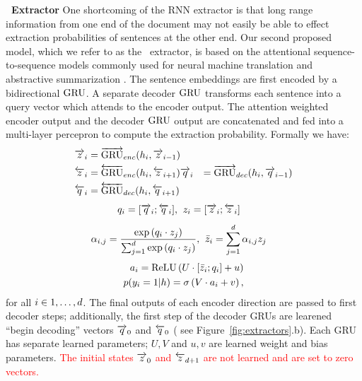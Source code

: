 \textbf{\sts~Extractor} One shortcoming of the RNN extractor is that long range
information from one end of the document may not easily be able to effect 
extraction probabilities of sentences at the other end. 
Our second proposed model, which we refer to as the \stsbf~extractor,
is based on the attentional sequence-to-sequence models commonly
used for neural machine translation \cite{badhanau} and 
abstractive summarization \cite{see}. The sentence embeddings are first
encoded by a bidirectional $\operatorname{GRU}$. A separate decoder $\operatorname{GRU}$ transforms each 
sentence into a query vector which attends to the encoder output. The
attention weighted encoder output and the decoder $\operatorname{GRU}$ output are concatenated
and fed into a multi-layer percepron to compute the extraction probability.
Formally we have:
\begin{align}
  \overrightarrow{z}_i &= \overrightarrow{\operatorname{GRU}}_{enc}(h_i, \overrightarrow{z}_{i-1}) \\
  \overleftarrow{z}_i &= \overleftarrow{\operatorname{GRU}}_{enc}(h_i, \overleftarrow{z}_{i+1}) 
  \overrightarrow{q}_i &= \overrightarrow{\operatorname{GRU}}_{dec}(h_i, \overrightarrow{q}_{i-1}) \\
  \overleftarrow{q}_i &= \overleftarrow{\operatorname{GRU}}_{dec}(h_i, \overleftarrow{q}_{i+1}) 
\end{align}
\begin{align}
 q_i = [\overrightarrow{q}_i; \overleftarrow{q}_i], &\;\;
 z_i = [\overrightarrow{z}_i; \overleftarrow{z}_i] 
\end{align}
\begin{align}
 \alpha_{i,j} = 
   \frac{\exp \left(q_i \cdot z_j \right)}{
   \sum_{j=1}^{d}\exp\left(q_i \cdot z_j\right)}, 
& \;\; \bar{z}_i = \sum_{j=1}^{d} \alpha_{i,j} z_j 
\end{align}
\begin{align}
   a_i = \operatorname{ReLU}\left(U \cdot [\bar{z}_i; q_i] + u \right)&\\
   p(y_i=1|h) = \sigma\left(V\cdot a_i + v  \right),
\end{align}
for all $i \in 1, \ldots, d$.
The final outputs of each encoder direction are passed to first decoder
steps; additionally, the first step of the decoder GRUs are learened 
``begin decoding'' vectors $\overrightarrow{q}_0$ and $\overleftarrow{q}_0$ (
see Figure~\ref{fig:extractors}.b).
Each GRU has separate learned 
parameters; $U, V$ and $u, v$ are learned weight and bias parameters.
\textcolor{red}{The initial states $\overrightarrow{z}_0$ and $\overleftarrow{z}_{d + 1}$ are not 
learned and are set to zero vectors.}


